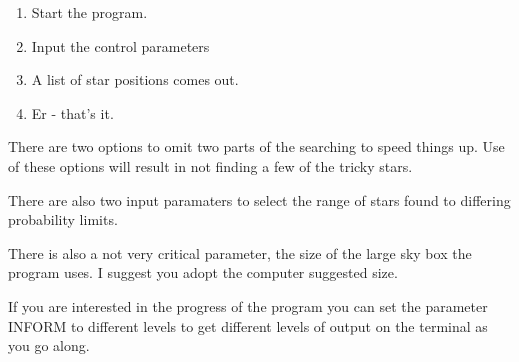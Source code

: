 \begin{small}
{{\begin{enumerate}
  \item Start the program.
  \item Input the control parameters
  \item A list of star positions comes out.
  \item Er - that's it.
\end{enumerate}

  There are two options to omit two parts of the searching to speed
  things up. Use of these options will result in not finding a few of
  the tricky stars.

  There are also two input paramaters to select the range of stars
  found to differing probability limits.

  There is also a not very critical parameter, the size of the large
  sky box the program uses. I suggest you adopt the computer suggested
  size.

  If you are interested in the progress of the program you can set
  the parameter INFORM to different levels to get different levels of
  output on the terminal as you go along.

}}
\end{small}
